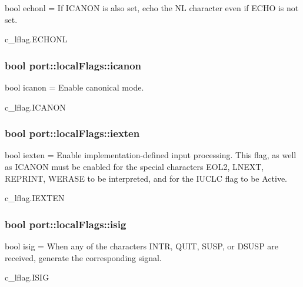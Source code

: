 bool echonl = If I\+C\+A\+N\+ON is also set, echo the NL character even if E\+C\+HO is not set. 

c\+\_\+lflag.\+E\+C\+H\+O\+NL
\subsubsection[{\texorpdfstring{icanon}{icanon}}]{\setlength{\rightskip}{0pt plus 5cm}bool port\+::local\+Flags\+::icanon}\hypertarget{classport_1_1localFlags_ab26f2ad4df346449c9cde1d060cb0e98}{}\label{classport_1_1localFlags_ab26f2ad4df346449c9cde1d060cb0e98}


bool icanon = Enable canonical mode. 

c\+\_\+lflag.\+I\+C\+A\+N\+ON
\subsubsection[{\texorpdfstring{iexten}{iexten}}]{\setlength{\rightskip}{0pt plus 5cm}bool port\+::local\+Flags\+::iexten}\hypertarget{classport_1_1localFlags_a07fb7cb6582c8b074a20461f5702ac35}{}\label{classport_1_1localFlags_a07fb7cb6582c8b074a20461f5702ac35}


bool iexten = Enable implementation-\/defined input processing. This flag, as well as I\+C\+A\+N\+ON must be enabled for the special characters E\+O\+L2, L\+N\+E\+XT, R\+E\+P\+R\+I\+NT, W\+E\+R\+A\+SE to be interpreted, and for the I\+U\+C\+LC flag to be Active. 

c\+\_\+lflag.\+I\+E\+X\+T\+EN
\subsubsection[{\texorpdfstring{isig}{isig}}]{\setlength{\rightskip}{0pt plus 5cm}bool port\+::local\+Flags\+::isig}\hypertarget{classport_1_1localFlags_a7f2f72947d3b62649d50d4d7931d78bd}{}\label{classport_1_1localFlags_a7f2f72947d3b62649d50d4d7931d78bd}


bool isig = When any of the characters I\+N\+TR, Q\+U\+IT, S\+U\+SP, or D\+S\+U\+SP are received, generate the corresponding signal. 

c\+\_\+lflag.\+I\+S\+IG
